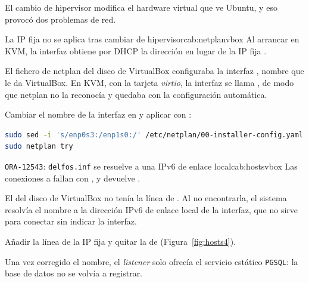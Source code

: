 El cambio de hipervisor modifica el hardware virtual que ve Ubuntu, y eso provocó dos problemas de red.

\begin{cabezazo}{La IP fija no se aplica tras cambiar de hipervisor}{cab:netplanvbox}
\problema Al arrancar en KVM, la interfaz obtiene por DHCP la dirección
 en lugar de la IP fija .

\causa El fichero de netplan del disco de VirtualBox configuraba la interfaz
, nombre que le da VirtualBox. En KVM, con la tarjeta
\textit{virtio}, la interfaz se llama , de modo que netplan no la
reconocía y quedaba con la configuración automática.

\solucion Cambiar el nombre de la interfaz en
 y aplicar con :
\begin{lstlisting}[language=bash]
sudo sed -i 's/enp0s3:/enp1s0:/' /etc/netplan/00-installer-config.yaml
sudo netplan try
\end{lstlisting}
\end{cabezazo}

\begin{cabezazo}{\texttt{ORA-12543}: \texttt{delfos.inf} se resuelve a una IPv6 de enlace local}{cab:hostsvbox}
\problema Las conexiones a  fallan con
, y
 devuelve .

\causa El  del disco de VirtualBox no tenía la línea de
. Al no encontrarla, el sistema resolvía el nombre a la
dirección IPv6 de enlace local de la interfaz, que no sirve para conectar sin
indicar la interfaz.

\solucion Añadir la línea de la IP fija y quitar la de 
(Figura~\ref{fig:hosts4}).
\end{cabezazo}


Una vez corregido el nombre, el \textit{listener} solo ofrecía el servicio estático \texttt{PGSQL}: la base de datos no se volvía a registrar.

